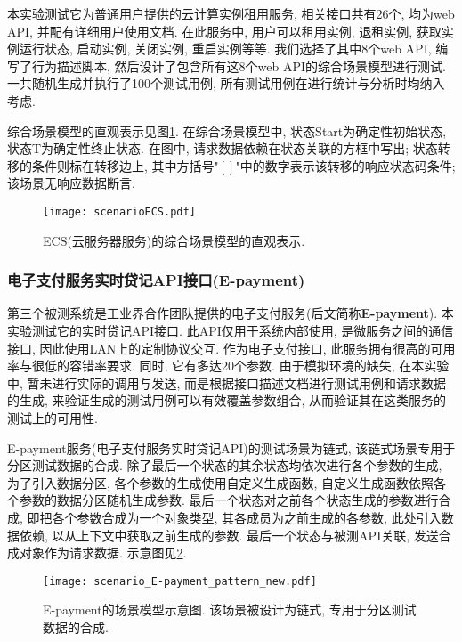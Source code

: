                 本实验测试它为普通用户提供的云计算实例租用服务, 相关接口共有26个, 均为web API, 并配有详细用户使用文档. 在此服务中, 用户可以租用实例, 退租实例, 获取实例运行状态, 启动实例, 关闭实例, 重启实例等等. 我们选择了其中8个web API, 编写了行为描述脚本, 然后设计了包含所有这8个web API的综合场景模型进行测试. 一共随机生成并执行了100个测试用例, 所有测试用例在进行统计与分析时均纳入考虑.

                综合场景模型的直观表示见图\ref{fig:ecs_scenario}. 在综合场景模型中, 状态Start为确定性初始状态, 状态T为确定性终止状态. 在图中, 请求数据依赖在状态关联的方框中写出; 状态转移的条件则标在转移边上, 其中方括号"$\left[\right]$"中的数字表示该转移的响应状态码条件; 该场景无响应数据断言.
        
                \begin{figure}[!htb]
                    \centering
                    \texttt{[image: scenarioECS.pdf]}
                    \caption[云服务器服务综合场景模型]{ECS(云服务器服务)的综合场景模型的直观表示.}
                    \label{fig:ecs_scenario}
                \end{figure}
            
            \subsubsection*{电子支付服务实时贷记API接口(E-payment)}
                \label{sec:epayment_setup}
                第三个被测系统是工业界合作团队提供的电子支付服务(后文简称\textbf{E-payment}). 本实验测试它的实时贷记API接口. 此API仅用于系统内部使用, 是微服务之间的通信接口, 因此使用LAN上的定制协议交互. 作为电子支付接口, 此服务拥有很高的可用率与很低的容错率要求. 同时, 它有多达20个参数. 由于模拟环境的缺失, 在本实验中, 暂未进行实际的调用与发送, 而是根据接口描述文档进行测试用例和请求数据的生成, 来验证生成的测试用例可以有效覆盖参数组合, 从而验证其在这类服务的测试上的可用性.
                
                E-payment服务(电子支付服务实时贷记API)的测试场景为链式, 该链式场景专用于分区测试数据的合成. 除了最后一个状态的其余状态均依次进行各个参数的生成, 为了引入数据分区, 各个参数的生成使用自定义生成函数, 自定义生成函数依照各个参数的数据分区随机生成参数. 最后一个状态对之前各个状态生成的参数进行合成, 即把各个参数合成为一个对象类型, 其各成员为之前生成的各参数, 此处引入数据依赖, 以从上下文中获取之前生成的参数. 最后一个状态与被测API关联, 发送合成对象作为请求数据. 示意图见\ref{fig:epayment_scenario}.
        
                \begin{figure}[!htb]
                    \centering
                    \texttt{[image: scenario\_E-payment\_pattern\_new.pdf]}
                    \caption[E-payment的场景模型示意图]{E-payment的场景模型示意图. 该场景被设计为链式, 专用于分区测试数据的合成.}
                    \label{fig:epayment_scenario}
                \end{figure}

